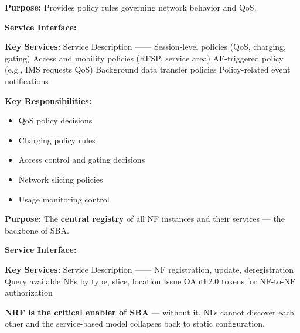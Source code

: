 
\textbf{Purpose:} Provides policy rules governing network behavior and QoS.

\textbf{Service Interface:} 

\textbf{Key Services:}\CNbr{}\textbar{} Service \textbar{} Description \textbar{}\CNbr{}\textbar{}—\textbar{}—\textbar{}\CNbr{}\textbar{} \allowbreak{} \textbar{} Session-level policies (QoS, charging, gating) \textbar{}\CNbr{}\textbar{} \allowbreak{} \textbar{} Access and mobility policies (RFSP, service area) \textbar{}\CNbr{}\textbar{} \allowbreak{} \textbar{} AF-triggered policy (e.g., IMS requests QoS) \textbar{}\CNbr{}\textbar{} \allowbreak{} \textbar{} Background data transfer policies \textbar{}\CNbr{}\textbar{}  \textbar{} Policy-related event notifications \textbar{}

\textbf{Key Responsibilities:}

\begin{itemize}
\tightlist
\item
  QoS policy decisions
\item
  Charging policy rules
\item
  Access control and gating decisions
\item
  Network slicing policies
\item
  Usage monitoring control
\end{itemize}


\textbf{Purpose:} The \textbf{central registry} of all NF instances and their services — the backbone of SBA.

\textbf{Service Interface:} 

\textbf{Key Services:}\CNbr{}\textbar{} Service \textbar{} Description \textbar{}\CNbr{}\textbar{}—\textbar{}—\textbar{}\CNbr{}\textbar{}  \textbar{} NF registration, update, deregistration \textbar{}\CNbr{}\textbar{}  \textbar{} Query available NFs by type, slice, location \textbar{}\CNbr{}\textbar{}  \textbar{} Issue OAuth2.0 tokens for NF-to-NF authorization \textbar{}

\begin{CNquote}

\CNstar{} \textbf{NRF is the critical enabler of SBA} — without it, NFs cannot discover each other and the service-based model collapses back to static configuration.

\end{CNquote}

